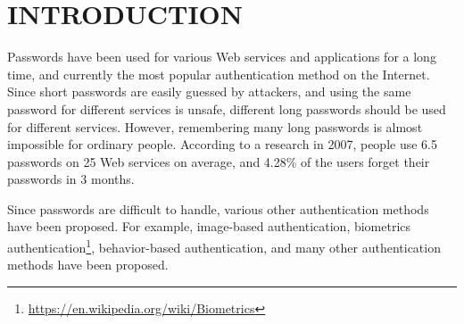 \documentclass{sigchi}
\begin{document}
\section{INTRODUCTION}

% 

Passwords have been used for various Web services and applications
for a long time, and currently the most popular authentication method on the Internet.
%
Since short passwords are easily guessed by attackers, and
using the same password for different services is unsafe,
different long passwords should be used for different services.
However,
remembering many long passwords is almost impossible for ordinary people.
%
According to a research in 2007,
people use 6.5 passwords on 25 Web services on average, and
4.28\% of the users forget their passwords in 3 months\cite{Florencio:2007:LSW:1242572.1242661}.



%   

Since passwords are difficult to handle,
various other authentication methods have been proposed.
For example,
image-based authentication\cite{Biddle:2012:GPL:2333112.2333114}\cite{GraphicalPasswords}, 
biometrics authentication\footnote{
  \url{https://en.wikipedia.org/wiki/Biometrics}
},
behavior-based authentication\cite{Dandapat:2015:AYD:2702123.2702457}, 
and many other authentication methods have been proposed.

\end{document}
